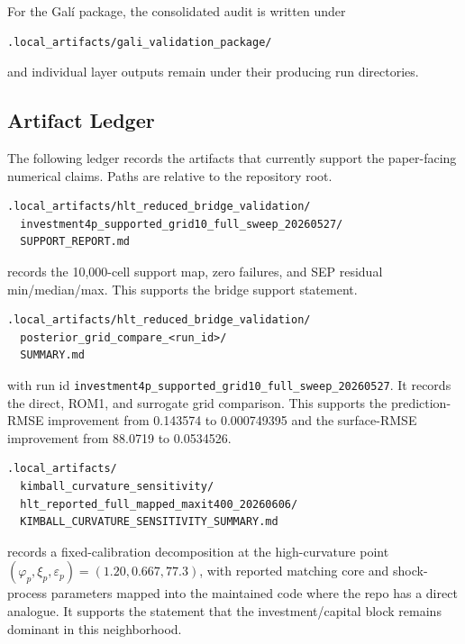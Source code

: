 \documentclass[12pt]{article}
\begin{document}
For the Gal\'i package, the consolidated audit is written under
\begin{verbatim}
.local_artifacts/gali_validation_package/
\end{verbatim}
and individual layer outputs remain under their producing run directories.

\subsection{Artifact Ledger}
\label{apptech:artifact_ledger}

The following ledger records the artifacts that currently support the
paper-facing numerical claims. Paths are relative to the repository root.

\begin{description}[leftmargin=2em,style=nextline,itemsep=0.45em]
\item[HLT bridge support.]
\begin{verbatim}
.local_artifacts/hlt_reduced_bridge_validation/
  investment4p_supported_grid10_full_sweep_20260527/
  SUPPORT_REPORT.md
\end{verbatim}
records the 10,000-cell support map, zero failures, and SEP residual
min/median/max. This supports the bridge support statement.

\item[HLT bridge posterior grid.]
\begin{verbatim}
.local_artifacts/hlt_reduced_bridge_validation/
  posterior_grid_compare_<run_id>/
  SUMMARY.md
\end{verbatim}
with run id \texttt{investment4p\_supported\_grid10\_full\_sweep\_20260527}.
It records the direct, ROM1, and surrogate grid comparison. This supports the
prediction-RMSE improvement from 0.143574 to 0.000749395 and the surface-RMSE
improvement from 88.0719 to 0.0534526.

\item[HLT high-Kimball neighborhood stress.]
\begin{verbatim}
.local_artifacts/
  kimball_curvature_sensitivity/
  hlt_reported_full_mapped_maxit400_20260606/
  KIMBALL_CURVATURE_SENSITIVITY_SUMMARY.md
\end{verbatim}
records a fixed-calibration decomposition at the
\citet{harding2022missingdeflation} high-curvature point
\((\varphi_p,\xi_p,\varepsilon_p)=(1.20,0.667,77.3)\), with reported matching
core and shock-process parameters mapped into the maintained code where the
repo has a direct analogue. It supports the statement that the
investment/capital block remains dominant in this neighborhood.


\end{description}
\end{document}
